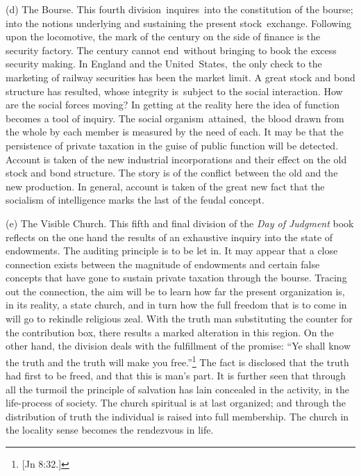\documentclass[twoside,symmetric,nobib,justified]{tufte-book}
\begin{document}
\begin{hangparas}{.25in}{1}
(d) The Bourse. This fourth division~inquires~into the constitution of
the bourse; into the notions underlying and sustaining the present
stock~exchange. Following upon the locomotive, the mark of the century
on the side of finance is the security factory. The century cannot
end~without bringing to book the excess security making. In England and
the United~States,~the only check to the marketing of railway securities
has been the market limit. A great stock and bond structure has
resulted, whose integrity is~subject to the social interaction. How are
the social forces moving? In getting at the reality here the idea of
function becomes a tool of inquiry. The social organism~attained,~the
blood drawn from the whole by each member is measured by the need of
each. It may be that the persistence of private taxation in the guise of
public function will be detected. Account is taken of the new industrial
incorporations and their effect on the old stock and bond structure. The
story is of the conflict between the old and the new production. In
general, account is taken of the great new fact that the socialism of
intelligence marks the last of the feudal concept.~~

(e) The Visible Church. This fifth and final division of the \emph{Day
of Judgment} book reflects on the one hand the results of an exhaustive
inquiry into the state of endowments. The auditing principle is to be
let in. It may appear that a close connection exists between the
magnitude of endowments and certain false concepts that have gone to
sustain private taxation through the bourse. Tracing out the connection,
the aim will be to learn how far the present organization is, in its
reality, a state church, and in turn how the full freedom that is to
come in will go to rekindle religious zeal. With the truth man
substituting the counter for the contribution box, there results a
marked alteration in this region. On the other hand, the division deals
with the fulfillment of the promise: ``Ye shall know the truth and the
truth will make you free.''\footnote{{[}Jn 8:32.{]}} The fact is
disclosed that the truth had first to be freed, and that this is man's
part. It is further seen that through all the turmoil the principle of
salvation has lain concealed in the activity, in the life-process of
society. The church spiritual is at last organized; and through the
distribution of truth the individual is raised into full membership. The
church in the locality sense becomes the rendezvous in life.~

\end{hangparas}
\end{document}
